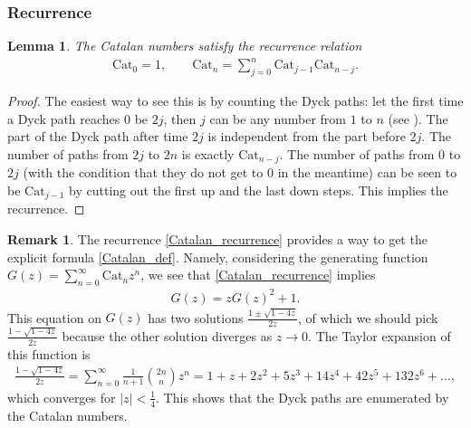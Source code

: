\documentclass[letterpaper,11pt,oneside,reqno]{amsart}
\numberwithin{equation}{section}
\newtheorem{lemma}[proposition]{Lemma}
\theoremstyle{definition}
\newtheorem{remark}[proposition]{Remark}
\begin{document}

\subsubsection{Recurrence} %
\label{ssub:recurrence}

\begin{lemma}\label{lemma:Dyck_and_recurrence}
The Catalan numbers satisfy the recurrence relation
\begin{align}\label{Catalan_recurrence}
	\mathrm{Cat}_0=1,\qquad
	\mathrm{Cat}_{n}=\sum_{j=0}^n \mathrm{Cat}_{j-1}\mathrm{Cat}_{n-j}.
\end{align}
\end{lemma}
\begin{proof}
	The easiest way to see this is by counting the Dyck paths: let the first time a Dyck path 
	reaches $0$ be $2j$, then $j$ can be any number from $1$ to $n$ (see ). 
	The part of the Dyck path after time $2j$ is independent from the 
	part before $2j$. The number of paths 
	from $2j$ to $2n$ is exactly $\mathrm{Cat}_{n-j}$. The 
	number of paths from $0$ to $2j$ 
	(with the condition that they do not get to $0$ in the meantime)
	can be seen to be $\mathrm{Cat}_{j-1}$ by cutting out the first up and the 
	last down steps. This implies the recurrence.
\end{proof}

\begin{remark}\label{rmk:from_recurrence_to_explicit_formula}
	The recurrence \eqref{Catalan_recurrence} provides a way to 
	get the explicit formula \eqref{Catalan_def}. Namely, considering
	the generating function $G(z)=\sum_{n=0}^{\infty}\mathrm{Cat}_n z^{n}$, 
	we see that \eqref{Catalan_recurrence} implies
	\begin{align*}
		G(z)=zG(z)^{2}+1.
	\end{align*}
	This equation on $G(z)$ has two solutions $\frac{1\pm\sqrt{1-4z}}{2z}$, 
	of which we should pick 
	$\frac{1-\sqrt{1-4z}}{2z}$ because the other solution diverges as $z\to0$.
	The Taylor expansion of this function
	is
	\begin{align*}
		\frac{1-\sqrt{1-4z}}{2z}=
		\sum_{n=0}^{\infty}\frac{1}{n+1}\binom{2n}n z^{n}=
		1+z+2 z^2+5 z^3+14 z^4+42 z^5+132 z^6+\ldots,
	\end{align*}
	which converges for $|z|<\frac14$.
	This shows that the Dyck paths are enumerated by the Catalan numbers.
\end{remark}
\end{document}
